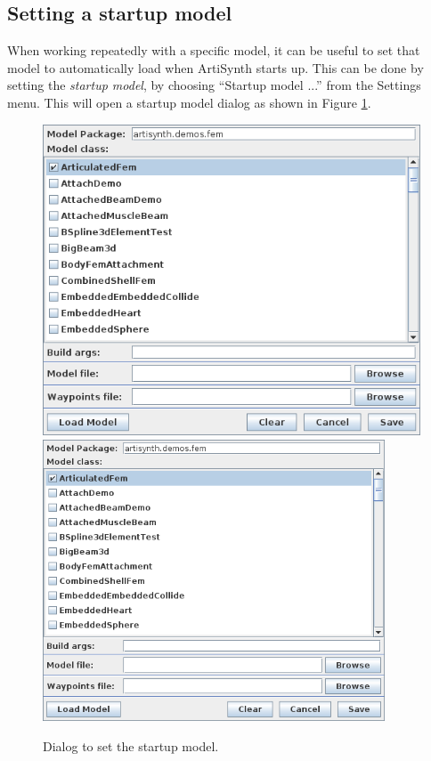 \documentclass{article}
\begin{document}
\subsection{Setting a startup model}

When working repeatedly with a specific model, it can be useful to set
that model to automatically load when ArtiSynth starts up. This can be
done by setting the {\it startup model}, by choosing {\sf ``Startup
model ...''} from the {\sf Settings} menu. This will open a
startup model dialog as shown in Figure
\ref{startupModelDialog:fig}.

\begin{figure}[h]
\begin{center}
\iflatexml
\includegraphics[]{images/startupModelDialog}
\else
\includegraphics[width=4in]{images/startupModelDialog}
\fi
\end{center}
\caption{Dialog to set the startup model.}%
\label{startupModelDialog:fig}
\end{figure}
\end{document}
